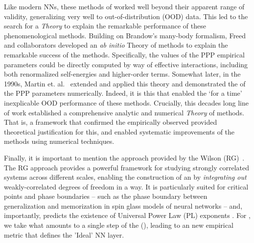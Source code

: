 Like modern NNs, these \SemiEmpirical methods of \QuantumChemistry
worked well beyond their apparent range of validity,
generalizing very well to out-of-distribution (OOD) data. This led to the
search for a \SemiEmpirical \emph{Theory} to explain the
remarkable performance of these phenomenological methods.
Building on Brandow’s many-body formalism, Freed and collaborators
\cite{freed1977, Freed1983}
developed an \emph{ab initio} \EffectiveHamiltonian
Theory of \SemiEmpirical methods to explain the remarkable success of the \SemiEmpirical methods.
Specifically, the values of the PPP empirical parameters could be directly computed by way of
effective interactions, including both renormalized self-energies and higher-order terms.
 Somewhat later, in the 1990s,
 Martin et. al.~\cite{MartinFreed1996, Martin1996, Martin1996_CPL, Martin1998}
 extended and applied this \EffectiveHamiltonian theory
 and demonstrated the \Universality of the \SemiEmpirical PPP parameters numerically.
 Indeed, it is this \Universality that enabled the `for a time' inexplicable
 OOD performance of these methods.
 Crucially, this decades long line of work established a comprehensive
 analytic and numerical \emph{Theory} of \SemiEmpirical methods.
 That is, a framework that confirmed the empirically observed \Universality
 provided theoretical justification for this,
 and enabled systematic improvements of the methods using numerical techniques.

 Finally, it is important to mention the \EffectiveHamiltonian approach provided by the Wilson \emph{\RenormalizationGroup}
 (RG)~\cite{NobelPrizeRG,PhysRevLett.69.800}.
 The RG approach provides a powerful framework for studying strongly correlated systems across different scales,
 enabling the construction of an \EffectiveHamiltonian by \emph{integrating out} weakly-correlated degrees of freedom in a \ScaleInvariant way.
 It is particularly suited for critical points and phase boundaries --
 such as the phase boundary between generalization and memorization in spin glass models of neural networks --
 and, importantly, predicts the existence of Universal Power Law (PL) exponents .
For \SETOL, we take what amounts to a single step of the \emph{\ExactRenormalizationGroup} (\ERG), leading to an new empirical metric
that defines the 'Ideal' NN layer.

